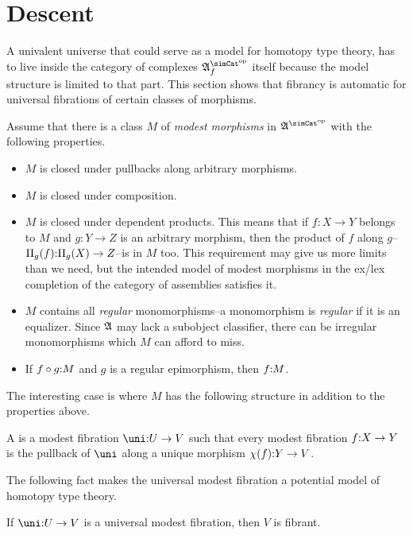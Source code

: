 \documentclass[csh.tex]{subfiles}
\begin{document}
\section{Descent}
A univalent universe that could serve as a model for homotopy type theory, has to live inside the category of complexes $\ambient\s\f$ itself because the model structure is limited to that part. This section shows that fibrancy is automatic for universal fibrations of certain classes of morphisms.

\newcommand\dprod[1]{\Pi_{#1}}
Assume that there is a class $M$ of \emph{modest morphisms} in $\ambient\s$ with the following properties.
\begin{itemize}
\item $M$ is closed under pullbacks along arbitrary morphisms.
\item $M$ is closed under composition.
\item $M$ is closed under dependent products. This means that if $f:X\to Y$ belongs to $M$ and $g:Y\to Z$ is an arbitrary morphism, then the product of $f$ along $g$--$\dprod g(f) \of \dprod g(X)\to Z$--is in $M$ too. This requirement may give us more limits than we need, but the intended model of modest morphisms in the ex/lex completion of the category of assemblies satisfies it.
\item $M$ contains all \emph{regular} monomorphisms--a monomorphism is \emph{regular} if it is an equalizer. Since $\mathfrak A$ may lack a subobject classifier, there can be irregular monomorphisms which $M$ can afford to miss.
\item If $f\circ g\mathord : M$ and $g$ is a regular epimorphism, then $f\mathord : M$. %
\end{itemize} 

The interesting case is where $M$ has the following structure in addition to the properties above.

\begin{definition} A  is a modest fibration $\uni\of U\to V$ such that every modest fibration $f\mathord : X\to Y$ is the pullback of $\uni$ along a unique morphism $\chi(f)\mathord : Y\to V$.
\end{definition}

The following fact makes the universal modest fibration a potential model of homotopy type theory.

\begin{theorem} If $\uni\of U\to V$ is a universal modest fibration, then $V$ is fibrant. \label{fibrant universe} \end{theorem}
\end{document}
